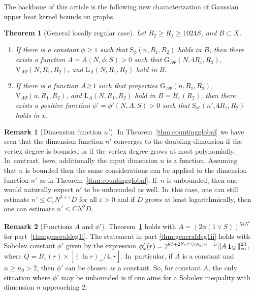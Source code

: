\documentclass[JEP,XML,SOM,Unicode,published]{cedram}
\newenvironment{enumeratei}
{\bgroup\def\theenumi{\roman{enumi}}\def\theenumii{\arabic{enumii}}\begin{enumerate}}
{\end{enumerate}\egroup}
\newcommand{\spfrac}[2]{\sfrac{#1}{(#2)}}
\newcommand{\rG}{\mathrm{G}}
\newcommand{\rS}{\mathrm{S}}
\newcommand{\rV}{\mathrm{V}}
\newcommand{\rL}{\mathrm{L}}
\theoremstyle{plain}
\newtheorem{theorem}{Theorem}[section]
\theoremstyle{definition}
\newtheorem*{remark}{Remark}
\DeclareMathOperator{\Eins}{\mathbf{1}}
\begin{document}
The backbone of this article is the following new characterization of Gaussian upper heat kernel bounds on graphs.

\begin{theorem}[General locally regular case]\label{thm:generaldeg1}
Let
$R_2\geq R_1\geq {1024S}$, and $ B\subset X $.
\begin{enumeratei}
\item\label{thm:generaldeg1i}
If there is a constant $ \phi\ge 1 $ such that $\rS_\phi (n,R_1,R_2)$ holds in $B$, then {there exists a function $A=A(N,\phi,S)>0$} such that $\rG_{A\Psi}(N,4R_1,R_2)$, $\rV_{\!A\Psi}(N,R_1,R_2)$, and $\rL_{{A}}(N,R_1,R_2)$ hold in $B$.
\item\label{thm:generaldeg1ii}
If there is a function $A\!\geq\!1\mkern-2mu$ such that properties $\rG_{A\Psi}(n,R_1,R_2)$, $\rV_{\!A\Psi} (n,R_1,R_2)$, and $\rL_A(N,R_1,R_2)$ hold in $B=B_x(R_2)$, then there exists a positive function $\phi'=\allowbreak\phi'(N,A,S)>0$ such that $\rS_{\phi'}(n',4 R_1,R_2)$ holds in $x$.
\end{enumeratei}
\end{theorem}

\begin{remark}[Dimension function $n'$]
In Theorem~\ref{thm:countingglobal} we have seen that the dimension function $ n' $ converges to the doubling dimension if the vertex degree is bounded or if the vertex degree grows at most polynomially. In~contrast, here, additionally the input dimension $ n $ is a function. Assuming that $n$ is bounded then the same considerations can be applied to the dimension function $ n' $ as in Theorem~\ref{thm:countingglobal}. If~$n$ is unbounded, then one would naturally expect $n'$ to be unbounded as well. In~this case, one can still estimate $n' \leq C_\varepsilon N^{3+\varepsilon} D$ for all $\varepsilon>0$ and if $D$ grows at least logarithmically, then one can estimate $n' \leq C N^{2} D$.
\end{remark}

\begin{remark}[Functions $A$ and $\phi'$]Theorem~\ref{thm:generaldeg1} holds with
$A=(2\phi(1\vee S))^{54N^3}$ for part~\eqref{thm:generaldeg1i}. The statement in part \eqref{thm:generaldeg1ii} holds with Sobolev constant $\phi'$ given by the expression $\phi_x'(r) =2^{87+2 \spfrac{N_x(r)}{N_x(r)-2}}\Vert A\Eins_{Q}\Vert_\infty ^{20}$, where $Q=B_x(r)\times [(\ln r)_+/4,r]$. In~particular, if $A$ is a constant and $ n\ge n_{0}>2 $, then $\phi'$ can be chosen as a constant. So, for constant $A$, the only situation where $ \phi' $ may be unbounded is if one aims for a Sobolev inequality with dimension $n $ approaching $ 2 $.
\end{remark}
\end{document}
